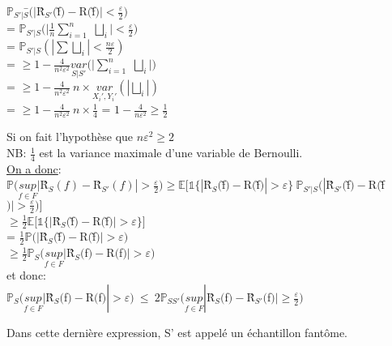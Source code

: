 \documentclass[a4paper]{report}
\begin{document}
\begin{tabbing}
$\mathds{P}_{S'|S}$\=$(|$\^R$_{S'}($\~f$)-$R$($\~f$)|< \frac{\varepsilon}{2})$\\
\> = $\mathds{P}_{S'|S}(|\frac{1}{n}\displaystyle{\sum_{i=1}^{n}}$ $\bigsqcup _{i}|< \frac{\varepsilon}{2})$\\
\> = $\mathds{P}_{S'|S}(|\sum \bigsqcup _{i}|< \frac{n \varepsilon}{2})$\\
\> = $\geq 1 - \frac{4}{n^2 \varepsilon ^2}\underset{S|S'}{var}(|\displaystyle{\sum_{i=1}^{n}}$ $ \bigsqcup _{i}|)$\\
\> = $\geq 1 - \frac{4}{n^2 \varepsilon ^2}\ n\times \underset{X_i', Y_i'}{var}(| \bigsqcup _{i}|)$\\
\> = $\geq 1 - \frac{4}{n^2 \varepsilon ^2}\ n\times \frac{1}{4}$ = $ 1 - \frac{4}{n \varepsilon ^2} \geq \frac{1}{2}$\\
\end{tabbing}
Si on fait l'hypothèse que $n\varepsilon ^2 \geq 2$\\
NB: $\frac{1}{4}$ est la variance maximale d'une variable de Bernoulli.\\
\newline
\underline{On a donc}:\\
$\mathds{P}(\underset{f\in F}{sup}|$\^R$_S(f)-$\^R$_{S'}(f)|>\frac{\varepsilon}{2})\geq \mathds{E}[\mathds{1}\{|$\^R$_S($\~f$)-$R$($\~f$)|>\varepsilon \}\ \mathds{P}_{S'|S}(|$\^R$_{S'}($\~f$)-$R$($\~f$)|>\frac{\varepsilon}{2})]$\\
$\geq \frac{1}{2} \mathds{E}[\mathds{1}\{|$\^R$_{S}($\~f$)-$R$($\~f$)|>\varepsilon\}]$\\
= $\frac{1}{2}\mathds{P}(|$\^R$_{S}($\~f$)-$R$($\~f$)|>\varepsilon) $\\
\newline
$\geq \frac{1}{2} \mathds{P}_S(\underset{f\in F}{sup}|$\^R$_{S}($f$)-$R$($f$)|>\varepsilon) $\\
\newline
et donc:\\
$ \mathds{P}_S(\underset{f\in F}{sup}|$\^R$_{S}($f$)-$R$($f$)|>\varepsilon)\ \leq \ 2\mathds{P}_{SS'}(\underset{f\in F}{sup}|$\^R$_{S}($f$)-$\^R$_{S'}($f$)|\geq \frac{\varepsilon}{2}) $\\
\begin{remark}
Dans cette dernière expression, S' est appelé un échantillon fantôme.\\
\end{remark}
\end{document}
